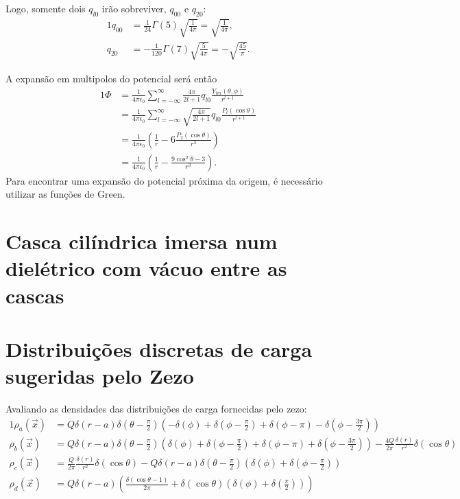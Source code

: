 \documentclass{article}
\begin{document}
Logo, somente dois $q_{l0}$ irão sobreviver, $q_{00}$ e $q_{20}$:
\begin{alignat}{1}
 q_{00} &= \frac{1}{24} \Gamma(5) \sqrt{\frac{1}{4 \pi}} = \sqrt{\frac{1}{4 \pi}} \mathrm{,}\\
 q_{20} &= -\frac{1}{120} \Gamma(7) \sqrt{\frac{5}{4 \pi}} = - \sqrt{\frac{45}{\pi}}\mathrm{.}
\end{alignat}

A expansão em multipolos do potencial será então
\begin{alignat}{1}
 \Phi &= \frac{1}{4 \pi \epsilon_0} \sum_{l = -\infty}^{\infty} \frac{4 \pi}{2l + 1} q_{l0} \frac{Y_{lm}(\theta,\phi)}{r^{l+1}} \\
 &= \frac{1}{4 \pi \epsilon_0} \sum_{l = -\infty}^{\infty} \sqrt{\frac{4 \pi}{2l + 1}} q_{l0} \frac{P_l(\cos{\theta})}{r^{l+1}} \\
 &= \frac{1}{4 \pi \epsilon_0} \left( \frac{1}{r} - 6 \frac{P_2(\cos{\theta})}{r^{3}} \right) \\
 &= \frac{1}{4 \pi \epsilon_0} \left( \frac{1}{r} - \frac{9\cos^2{\theta} - 3}{r^{3}} \right)\mathrm{.}
\end{alignat}
Para encontrar uma expansão do potencial próxima da origem, é necessário utilizar as funções de Green.

\section{Casca cilíndrica imersa num dielétrico com vácuo entre as cascas}

\section{Distribuições discretas de carga sugeridas pelo Zezo}
Avaliando as densidades das distribuições de carga fornecidas pelo zezo:
\begin{alignat}{1}
 \rho_a(\vec{x}) &= Q \delta(r-a)\delta\left( \theta - \frac{\pi}{2}\right)\left( -\delta(\phi) + \delta\left( \phi - \frac{\pi}{2} \right) +
 \delta\left( \phi - \pi \right) - \delta\left( \phi - \frac{3\pi}{2} \right) \right)\\
 \rho_b(\vec{x}) &= Q \delta(r-a)\delta\left( \theta - \frac{\pi}{2}\right)\left( \delta(\phi) + \delta\left( \phi - \frac{\pi}{2} \right) +
 \delta\left( \phi - \pi \right) + \delta\left( \phi - \frac{3\pi}{2} \right) \right) - \frac{4Q}{2\pi} \frac{\delta(r)}{r^2}\delta(\cos{\theta}) \\
 \rho_c(\vec{x}) &= \frac{Q}{2 \pi}\frac{\delta(r)}{r^2}\delta(\cos{\theta}) -Q\delta(r-a)\delta\left(\theta - \frac{\pi}{2}\right)
 \left( \delta(\phi) + \delta\left( \phi - \frac{\pi}{2} \right) \right)\\
 \rho_d(\vec{x}) &= Q\delta(r-a)\left( \frac{\delta(\cos{\theta}-1)}{2\pi} + \delta(\cos{\theta})\left(\delta(\phi) + \delta\left( \frac{\pi}{2} \right) \right) \right)
\end{alignat}
\end{document}
